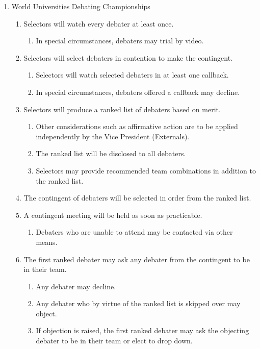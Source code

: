 \begin{enumerate}
\item World Universities Debating Championships
  \begin{enumerate}
  \item Selectors will watch every debater at least once.
    \begin{enumerate}
    \item In special circumstances, debaters may trial by video.
    \end{enumerate}
  \item Selectors will select debaters in contention to make the contingent.
    \begin{enumerate}
    \item Selectors will watch selected debaters in at least one callback.
    \item In special circumstances, debaters offered a callback may decline.
    \end{enumerate}
  \item Selectors will produce a ranked list of debaters based on merit.
    \begin{enumerate}
    \item Other considerations such as affirmative action are to be applied independently by the Vice President (Externals).
    \item The ranked list will be disclosed to all debaters.
    \item Selectors may provide recommended team combinations in addition to the ranked list.
    \end{enumerate}
  \item The contingent of debaters will be selected in order from the ranked list.
  \item A contingent meeting will be held as soon as practicable.
    \begin{enumerate}
    \item Debaters who are unable to attend may be contacted via other means.
    \end{enumerate}
  \item The first ranked debater may ask any debater from the contingent to be in their team. \label{wudc_contingent_forming_procedure}
    \begin{enumerate}
    \item Any debater may decline.
    \item Any debater who by virtue of the ranked list is skipped over may object.
    \item If objection is raised, the first ranked debater may ask the objecting debater to be in their team or elect to drop down.

\end{enumerate}
\end{enumerate}
\end{enumerate}

